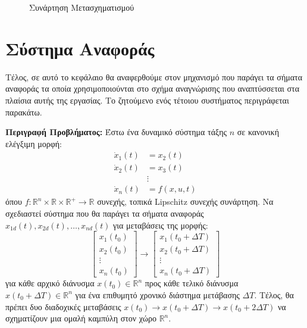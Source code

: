 \begin{figure}[t!]
	\centering
	
	\caption{Συνάρτηση Μετασχηματισμού}
	\label{fig:ppc_transformation_function}
\end{figure}



\section{Σύστημα Αναφοράς}
Τέλος, σε αυτό το κεφάλαιο θα αναφερθούμε στον μηχανισμό που παράγει τα σήματα αναφοράς τα οποία χρησιμοποιούνται στο σχήμα αναγνώρισης που αναπτύσσεται στα πλαίσια αυτής της εργασίας. Το ζητούμενο ενός τέτοιου συστήματος περιγράφεται παρακάτω.

\textbf{Περιγραφή Προβλήματος:} Έστω ένα δυναμικό σύστημα τάξης $n$ σε κανονική ελέγξιμη μορφή:
\begin{equation}
\begin{split}
\dot{x}_1(t) &= x_2(t) \\
\dot{x}_2(t) &= x_3(t) \\
&\vdots \\
\dot{x}_n(t) &= f(x,u,t)
\end{split}
\label{eq:canonical_system}
\end{equation}
όπου $f:\mathbb{R}^n \times \mathbb{R}\times \mathbb{R}^+ \rightarrow \mathbb{R}$ συνεχής, τοπικά Lipschitz συνεχής συνάρτηση. Να σχεδιαστεί σύστημα που θα παράγει τα σήματα αναφοράς $x_{1d}(t), x_{2d}(t), \dots, x_{nd}(t)$ για μεταβάσεις της μορφής:
\begin{equation}
	\begin{bmatrix}
		x_1(t_0) \\ x_2(t_0) \\ \vdots \\ x_n(t_0)
	\end{bmatrix}
	\rightarrow
	\begin{bmatrix}
	 x_1(t_0+ \Delta T) \\ x_2(t_0+ \Delta T) \\ \vdots \\ x_n(t_0+ \Delta T)
	\end{bmatrix}
	\label{eq:ref_transition}
\end{equation}
για κάθε αρχικό διάνυσμα $x(t_0) \in  \mathbb{R}^n$ προς κάθε τελικό διάνυσμα $x(t_0+\Delta T) \in  \mathbb{R}^n$ για ένα επιθυμητό χρονικό διάστημα μετάβασης $\Delta T$. Τέλος, θα πρέπει δυο διαδοχικές μεταβάσεις 
$x(t_0) \rightarrow x(t_0+ \Delta T) \rightarrow x(t_0+ 2\Delta T)$ να σχηματίζουν μια ομαλή καμπύλη στον χώρο $\mathbb{R}^n$.

